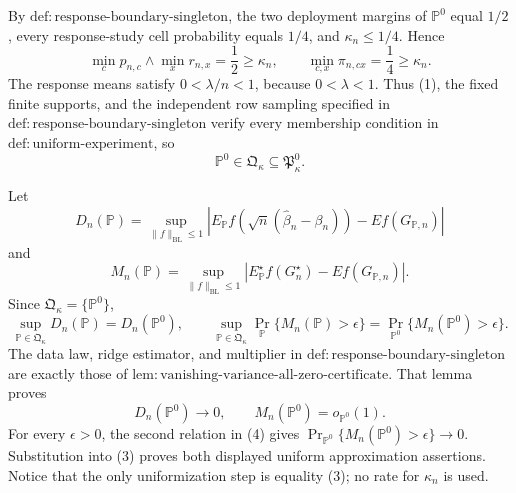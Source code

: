 By \(\mathrm{def:response\text{-}boundary\text{-}singleton}\), the two deployment margins of \(\mathbb P^0\) equal \(1/2\), every response-study cell probability equals \(1/4\), and \(\kappa_n\leq1/4\).  Hence
\[
\min_c p_{n,c}\wedge\min_x r_{n,x}=\frac12\geq\kappa_n,
\qquad
\min_{c,x}\pi_{n,cx}=\frac14\geq\kappa_n.
\tag{1}
\]
The response means satisfy \(0<\lambda/n<1\), because \(0<\lambda<1\).  Thus (1), the fixed finite supports, and the independent row sampling specified in \(\mathrm{def:response\text{-}boundary\text{-}singleton}\) verify every membership condition in \(\mathrm{def:uniform\text{-}experiment}\), so
\[
\mathbb P^0\in\mathfrak Q_{\kappa}\subseteq\mathfrak P_{\kappa}^{0}.
\tag{2}
\]

Let
\[
D_n(\mathbb P)=
\sup_{\lVert f\rVert_{\mathrm{BL}}\leq1}
\left|
E_{\mathbb P}f\!\left(\sqrt n(\widehat\beta_n-\beta_n)\right)
-E f(G_{\mathbb P,n})
\right|
\]
and
\[
M_n(\mathbb P)=
\sup_{\lVert f\rVert_{\mathrm{BL}}\leq1}
\left|E_{\mathbb P}^{\star}f(G_n^\star)-E f(G_{\mathbb P,n})\right|.
\]
Since \(\mathfrak Q_{\kappa}=\{\mathbb P^0\}\),
\[
\sup_{\mathbb P\in\mathfrak Q_{\kappa}}D_n(\mathbb P)=D_n(\mathbb P^0),
\qquad
\sup_{\mathbb P\in\mathfrak Q_{\kappa}}
\Pr_{\mathbb P}\{M_n(\mathbb P)>\epsilon\}
=\Pr_{\mathbb P^0}\{M_n(\mathbb P^0)>\epsilon\}.
\tag{3}
\]
The data law, ridge estimator, and multiplier in \(\mathrm{def:response\text{-}boundary\text{-}singleton}\) are exactly those of \(\mathrm{lem:vanishing\text{-}variance\text{-}all\text{-}zero\text{-}certificate}\).  That lemma proves
\[
D_n(\mathbb P^0)\longrightarrow0,
\qquad
M_n(\mathbb P^0)=o_{\mathbb P^0}(1).
\tag{4}
\]
For every \(\epsilon>0\), the second relation in (4) gives
\(\Pr_{\mathbb P^0}\{M_n(\mathbb P^0)>\epsilon\}\to0\).  Substitution into (3) proves both displayed uniform approximation assertions.  Notice that the only uniformization step is equality (3); no rate for \(\kappa_n\) is used.

